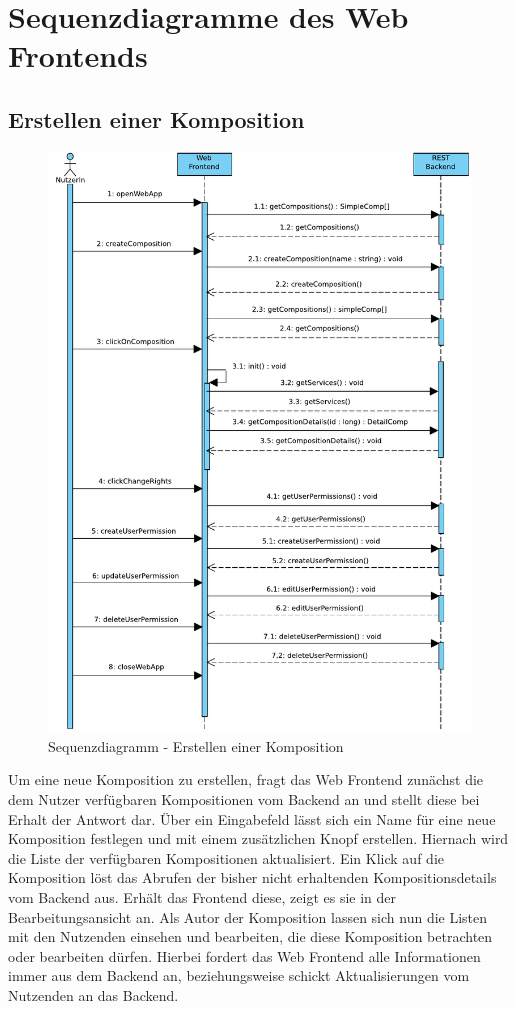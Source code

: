 \newpage
\section*{Sequenzdiagramme des Web Frontends}
\subsection*{ Erstellen einer Komposition}

\begin{figure}[!h]
	\centering
	\includegraphics[width=.5\textwidth]{img/Diagramme/Sequenz/Frontend_createComp}
			
	\caption{Sequenzdiagramm - Erstellen einer Komposition}
	\label{fig:sequenz-createComp}
\end{figure}

\noindent
Um eine neue Komposition zu erstellen, fragt das Web Frontend zunächst die dem Nutzer verfügbaren Kompositionen vom Backend an und stellt diese bei Erhalt der Antwort dar. Über ein Eingabefeld lässt sich ein Name für eine neue Komposition festlegen und mit einem zusätzlichen Knopf erstellen. Hiernach wird die Liste der verfügbaren Kompositionen aktualisiert. Ein Klick auf die Komposition löst das Abrufen der bisher nicht erhaltenden Kompositionsdetails vom Backend aus. Erhält das Frontend diese, zeigt es sie in der Bearbeitungsansicht an. Als Autor der Komposition lassen sich nun die Listen mit den Nutzenden einsehen und bearbeiten, die diese Komposition betrachten oder bearbeiten dürfen. Hierbei fordert das Web Frontend alle Informationen immer aus dem Backend an, beziehungsweise schickt Aktualisierungen vom Nutzenden an das Backend.

\newpage

